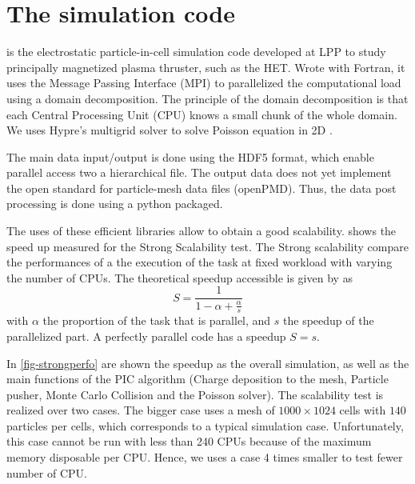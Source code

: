 

\section*{The \LPPic simulation code }
\label{sec-lppic}


\LPPic is the electrostatic particle-in-cell simulation code developed at \ac{LPP} to study principally magnetized plasma thruster, such as the \ac{HET}.
Wrote with Fortran, it uses the Message Passing Interface (MPI) to parallelized the computational load using a domain decomposition.
The principle of the domain decomposition is that each Central Processing Unit (CPU) knows a small chunk of the whole domain.
We uses {\sc Hypre}'s multigrid solver to solve Poisson equation in \ac{2D} \citep{falgout2002}.

The main data input/output is done using the HDF5 format, which enable parallel access two a hierarchical file.
The output data does not yet implement the open standard for particle-mesh data files (openPMD).
Thus, the data post processing is done using a python packaged.

The uses of these efficient libraries allow to obtain a good scalability.
 shows the speed up measured for the Strong Scalability test.
The Strong scalability compare the performances of a the execution of the task at fixed workload with varying the number of CPUs.
The theoretical speedup accessible is given by \citet{amdahl1967} as
\begin{equation} \label{eq-amdahl}
  S = \frac{1}{1 - \alpha + \frac{\alpha}{s}}
\end{equation}
with $\alpha$ the proportion of the task that is parallel, and $s$ the speedup of the parallelized part.
A perfectly parallel code has a speedup $S=s$.

In \cref{fig-strongperfo} are shown the speedup as the overall simulation, as well as the main functions of the \ac{PIC} algorithm (Charge deposition to the mesh, Particle pusher, Monte Carlo Collision and the Poisson solver).
The scalability test is realized over two cases. 
The bigger case uses a mesh of $1000\times1024$ cells with $140$ particles per cells, which corresponds to a typical simulation case.
Unfortunately, this case cannot be run with less than 240 CPUs because of the maximum memory disposable per CPU. 
Hence, we uses a case 4 times smaller to test fewer number of CPU.

